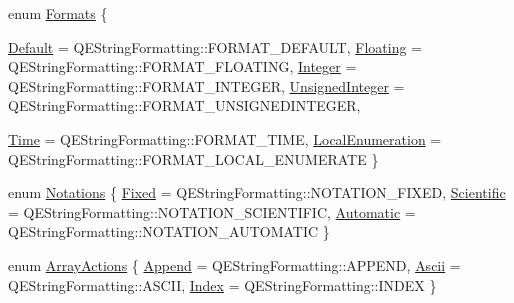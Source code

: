 \begin{DoxyCompactItemize}
\item 
enum \hyperlink{classQELineEdit_aaf6d4da2e751180b9fc82e80d506812a}{Formats} \{ \par
\hyperlink{classQELineEdit_aaf6d4da2e751180b9fc82e80d506812aac297e67121faae4fa724752b8c5c4a94}{Default} =  QEStringFormatting::FORMAT\_\-DEFAULT, 
\hyperlink{classQELineEdit_aaf6d4da2e751180b9fc82e80d506812aa30e55f5b5c45ade8e4bd7f86a4b5678e}{Floating} =  QEStringFormatting::FORMAT\_\-FLOATING, 
\hyperlink{classQELineEdit_aaf6d4da2e751180b9fc82e80d506812aac2a69c1f63dcb12587f07a8e3a9f18ed}{Integer} =  QEStringFormatting::FORMAT\_\-INTEGER, 
\hyperlink{classQELineEdit_aaf6d4da2e751180b9fc82e80d506812aaeedad5fbf89c0adbda2776e085899000}{UnsignedInteger} =  QEStringFormatting::FORMAT\_\-UNSIGNEDINTEGER, 
\par
\hyperlink{classQELineEdit_aaf6d4da2e751180b9fc82e80d506812aabddd9a88e03de1a7c5436274a2b34281}{Time} =  QEStringFormatting::FORMAT\_\-TIME, 
\hyperlink{classQELineEdit_aaf6d4da2e751180b9fc82e80d506812aa05a534c8ad25bd2f68fe1b5fc2191a14}{LocalEnumeration} =  QEStringFormatting::FORMAT\_\-LOCAL\_\-ENUMERATE
 \}
\item 
enum \hyperlink{classQELineEdit_a8037a63e14b30d7fce853e4d32156c14}{Notations} \{ \hyperlink{classQELineEdit_a8037a63e14b30d7fce853e4d32156c14a17c2ba73a02fab8167148963e52e61af}{Fixed} =  QEStringFormatting::NOTATION\_\-FIXED, 
\hyperlink{classQELineEdit_a8037a63e14b30d7fce853e4d32156c14a5db2a6993a6c4c3ad9cf8ab0035f715c}{Scientific} =  QEStringFormatting::NOTATION\_\-SCIENTIFIC, 
\hyperlink{classQELineEdit_a8037a63e14b30d7fce853e4d32156c14ab9aa8ebb99245ca9b1ad73650dc5b268}{Automatic} =  QEStringFormatting::NOTATION\_\-AUTOMATIC
 \}
\item 
enum \hyperlink{classQELineEdit_aed1607f3d06e29ed216cf5a7613415e1}{ArrayActions} \{ \hyperlink{classQELineEdit_aed1607f3d06e29ed216cf5a7613415e1adff8a28a0b2a7f346c0a77a5d772975f}{Append} =  QEStringFormatting::APPEND, 
\hyperlink{classQELineEdit_aed1607f3d06e29ed216cf5a7613415e1aa62c6fc978cb10b08d75902ec652cdfc}{Ascii} =  QEStringFormatting::ASCII, 
\hyperlink{classQELineEdit_aed1607f3d06e29ed216cf5a7613415e1af8fc8176f58206231cc4353f3c90c074}{Index} =  QEStringFormatting::INDEX
 \}
\end{DoxyCompactItemize}
